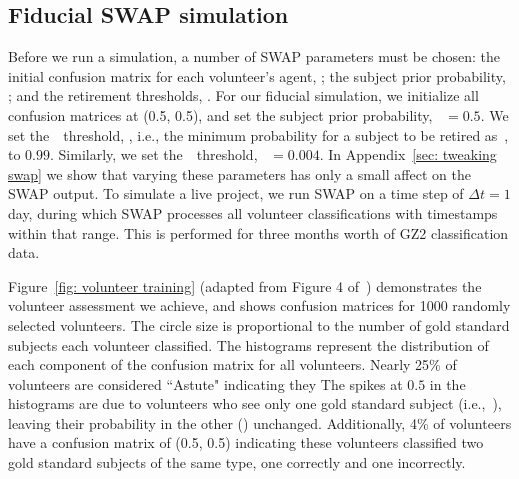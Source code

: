 \subsection{Fiducial SWAP simulation}\label{sec: fiducial}

Before we run a simulation, a number of SWAP parameters must be chosen: 
 the initial confusion matrix for each volunteer's agent, \added{(\Pf, \Pn)};
the subject prior probability, \added{\p}; and the retirement thresholds, . 
For our fiducial  simulation, we initialize all confusion matrices at (0.5, 0.5), 
and set the subject prior probability, \p~$= 0.5$. 
We set the~\feat~threshold, \tf, i.e., the minimum probability for a subject to be retired as~\feat, to $0.99$. Similarly, we set the~\notfeat~threshold, \tn~$= 0.004$. 
In Appendix~\ref{sec: tweaking swap} 
we show that varying these parameters has only a small affect on the SWAP output. 
To simulate a live project, we run SWAP on a time step of $\Delta t = 1$ day, 
during which SWAP processes all volunteer classifications with timestamps 
within that range. This is performed for three months worth of GZ2 classification data. 


Figure~\ref{fig: volunteer training} (adapted from Figure 4 of~\citealt{Marshall2016})
demonstrates the volunteer assessment we achieve, and shows confusion matrices 
 for 1000 randomly selected volunteers. The circle size is proportional to the number of 
gold standard subjects each volunteer classified. 
The histograms represent the distribution of each component
of the confusion matrix for all volunteers.
 Nearly 25\% of volunteers are considered ``Astute"  indicating
they 
The spikes at $0.5$ in the histograms are due to volunteers who see only one 
gold standard subject (i.e.,~\feat), leaving their probability in the 
other (\notfeat) unchanged.
Additionally, 4\% of volunteers have a confusion matrix of (0.5, 0.5) indicating these 
volunteers classified two gold standard subjects of the same type, one correctly and 
one incorrectly. 

